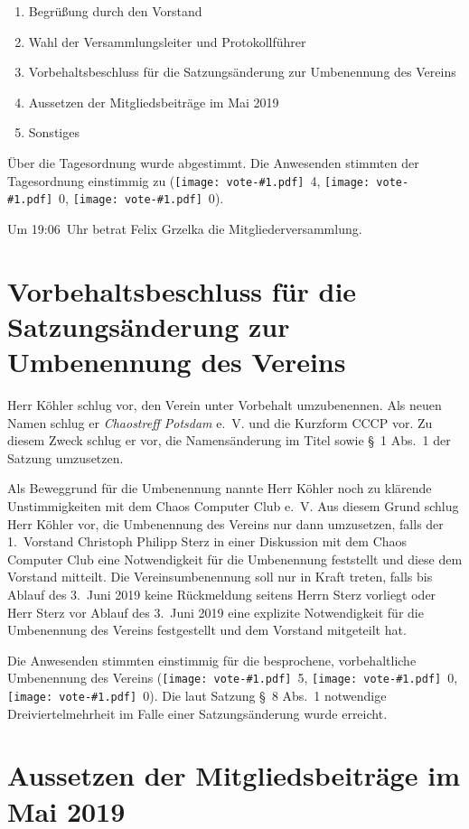 \documentclass[a4paper, 10pt, headings=normal]{scrartcl}
\newcommand{\votesign}[1]{\texttt{[image: vote-\#1.pdf]}}
\newcommand{\votesingle}[2]{\votesign{#1}~#2}
\newcommand{\vote}[3]{\votesingle{yes}{#1}, \votesingle{no}{#2}, \votesingle{abstention}{#3}}
\begin{document}
\begin{enumerate}
	\item
		Begrüßung durch den Vorstand
	\item
		Wahl der Versammlungsleiter und Protokollführer
	\item
		Vorbehaltsbeschluss für die Satzungsänderung zur Umbenennung des Vereins
	\item
		Aussetzen der Mitgliedsbeiträge im Mai 2019
	\item
		Sonstiges
\end{enumerate}
Über die Tagesordnung wurde abgestimmt.
Die Anwesenden stimmten der Tagesordnung einstimmig zu ({\vote{4}{0}{0}}).

Um {19:06}~Uhr betrat Felix Grzelka die Mitgliederversammlung.

\section{Vorbehaltsbeschluss für die Satzungsänderung zur Umbenennung des Vereins}

Herr Köhler schlug vor, den Verein unter Vorbehalt umzubenennen.
Als neuen Namen schlug er \emph{Chaostreff Potsdam} e.~V. und die Kurzform CCCP vor.
Zu diesem Zweck schlug er vor, die Namensänderung im Titel sowie §~1 Abs.~1 der Satzung umzusetzen.

Als Beweggrund für die Umbenennung nannte Herr Köhler noch zu klärende Unstimmigkeiten mit dem Chaos Computer Club e.~V.
Aus diesem Grund schlug Herr Köhler vor, die Umbenennung des Vereins nur dann umzusetzen, falls der 1.~Vorstand Christoph Philipp Sterz in einer Diskussion mit dem Chaos Computer Club eine Notwendigkeit für die Umbenennung feststellt und diese dem Vorstand mitteilt.
Die Vereinsumbenennung soll nur in Kraft treten, falls bis Ablauf des 3.~Juni 2019 keine Rückmeldung seitens Herrn Sterz vorliegt oder Herr Sterz vor Ablauf des 3.~Juni 2019 eine explizite Notwendigkeit für die Umbenennung des Vereins festgestellt und dem Vorstand mitgeteilt hat.

Die Anwesenden stimmten einstimmig für die besprochene, vorbehaltliche Umbenennung des Vereins ({\vote{5}{0}{0}}).
Die laut Satzung §~8 Abs.~1 notwendige Dreiviertelmehrheit im Falle einer Satzungsänderung wurde erreicht.

\section{Aussetzen der Mitgliedsbeiträge im Mai 2019}
\end{document}
